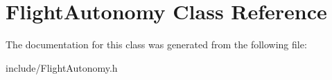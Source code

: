 \hypertarget{classFlightAutonomy}{}\section{Flight\+Autonomy Class Reference}
\label{classFlightAutonomy}


The documentation for this class was generated from the following file\+:\begin{DoxyCompactItemize}
\item 
include/Flight\+Autonomy.\+h\end{DoxyCompactItemize}

